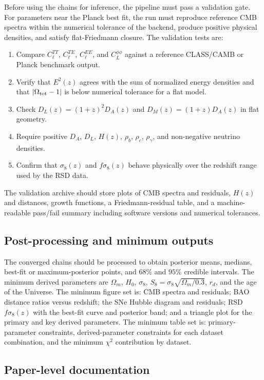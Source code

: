 \documentclass[pdflatex,sn-mathphys-num]{sn-jnl}%
\begin{document}
Before using the chains for inference, the pipeline must pass a validation gate.
For parameters near the Planck best fit, the run must reproduce reference CMB
spectra within the numerical tolerance of the backend, produce positive
physical densities, and satisfy flat-Friedmann closure. The validation tests are:
\begin{enumerate}
    \item Compare $C_\ell^{TT}$, $C_\ell^{TE}$, $C_\ell^{EE}$, and $C_L^{\phi\phi}$ against a reference CLASS/CAMB or Planck benchmark output.
    \item Verify that $E^2(z)$ agrees with the sum of normalized energy densities and that $|\Omega_{\rm tot}-1|$ is below numerical tolerance for a flat model.
    \item Check $D_L(z)=(1+z)^2D_A(z)$ and $D_M(z)=(1+z)D_A(z)$ in flat geometry.
    \item Require positive $D_A$, $D_L$, $H(z)$, $\rho_b$, $\rho_c$, $\rho_\gamma$, and non-negative neutrino densities.
    \item Confirm that $\sigma_8(z)$ and $f\sigma_8(z)$ behave physically over the redshift range used by the RSD data.
\end{enumerate}
The validation archive should store plots of CMB spectra and residuals,
$H(z)$ and distances, growth functions, a Friedmann-residual table, and a
machine-readable pass/fail summary including software versions and numerical
tolerances.

\subsection{Post-processing and minimum outputs}
\label{subsec:pipeline_postprocessing}

The converged chains should be processed to obtain posterior means, medians,
best-fit or maximum-posterior points, and $68\%$ and $95\%$ credible intervals.
The minimum derived parameters are $\Omega_m$, $H_0$, $\sigma_8$,
$S_8=\sigma_8\sqrt{\Omega_m/0.3}$, $r_d$, and the age of the Universe. The
minimum figure set is: CMB spectra and residuals; BAO distance ratios versus
redshift; the SNe Hubble diagram and residuals; RSD $f\sigma_8(z)$ with the
best-fit curve and posterior band; and a triangle plot for the primary and key
derived parameters. The minimum table set is: primary-parameter constraints,
derived-parameter constraints for each dataset combination, and the minimum
$\chi^2$ contribution by dataset.

\subsection{Paper-level documentation}
\label{subsec:pipeline_paper_structure}
\end{document}
